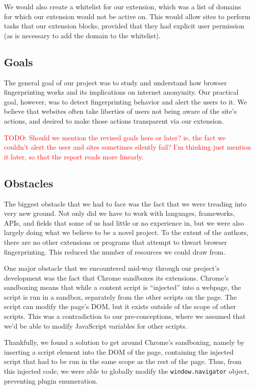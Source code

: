 \documentclass[12pt,a4paper]{article}
\begin{document}
We would also create a whitelist for our extension, which was a list of domains for which our extension would not be active on. This would allow sites to perform tasks that our extension blocks, provided that they had explicit user permission (as is necessary to add the domain to the whitelist).

\subsection{Goals}
The general goal of our project was to study and understand how browser fingerprinting works and its implications on internet anonymity. Our practical goal, however, was to detect fingerprinting behavior and alert the users to it. We believe that websites often take liberties of users not being aware of the site's actions, and desired to make those actions transparent via our extension.

\textcolor{red}{TODO: Should we mention the revised goals here or later? ie, the fact we couldn't alert the user and sites sometimes silently fail? I'm thinking just mention it later, so that the report reads more linearly.}

\subsection{Obstacles}
The biggest obstacle that we had to face was the fact that we were treading into very new ground. Not only did we have to work with languages, frameworks, APIs, and fields that some of us had little or no experience in, but we were also largely doing what we believe to be a novel project. To the extent of the authors, there are no other extensions or programs that attempt to thwart browser fingerprinting. This reduced the number of resources we could draw from.

One major obstacle that we encountered mid-way through our project's development was the fact that Chrome sandboxes its extensions. Chrome's sandboxing means that while a content script is ``injected'' into a webpage, the script is run in a sandbox, separately from the other scripts on the page. The script can modify the page's DOM, but it exists outside of the scope of other scripts. This was a contradiction to our pre-conceptions, where we assumed that we'd be able to modify JavaScript variables for other scripts.

Thankfully, we found a solution to get around Chrome's sandboxing, namely by inserting a script element into the DOM of the page, containing the injected script that had to be run in the same scope as the rest of the page. Thus, from this injected code, we were able to globally modify the \texttt{window.navigator} object, preventing plugin enumeration.
\end{document}

